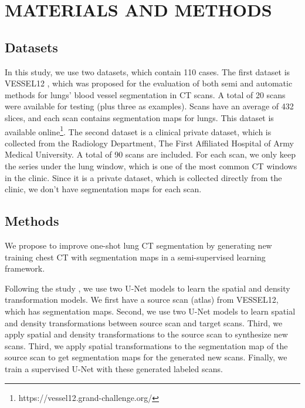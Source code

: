 \documentclass{article}
\begin{document}
\section{MATERIALS AND METHODS}
\label{sec:materials}

\subsection{Datasets}
\label{dataset}
In this study, we use two datasets, which contain 110 cases.
The first dataset is VESSEL12 \cite{rudyanto2014comparing}, which was proposed for the evaluation of both semi and automatic methods for lungs’ blood vessel segmentation in CT scans. A total of 20 scans were available for testing (plus three as examples). Scans have an average of 432 slices, and each scan contains segmentation maps for lungs. This dataset is available online\footnote{https://vessel12.grand-challenge.org/}.
The second dataset is a clinical private dataset, which is collected from the Radiology Department, The First Affiliated Hospital of Army Medical University. A total of 90 scans are included. For each scan, we only keep the series under the lung window, which is one of the most common CT windows in the clinic. Since it is a private dataset, which is collected directly from the clinic, we don't have segmentation maps for each scan. 

\subsection{Methods}
\label{methods}
We propose to improve one-shot lung CT segmentation by generating new training chest CT with segmentation maps in a semi-supervised learning framework.

Following the study \cite{zhao2019data}, we use two U-Net models to learn the spatial and density transformation models. 
We first have a source scan (atlas) from VESSEL12, which has segmentation maps. Second, we use two U-Net models to learn spatial and density transformations between source scan and target scans. Third, we apply spatial and density transformations to the source scan to synthesize new scans. Third, we apply spatial transformations to the segmentation map of the source scan to get segmentation maps for the generated new scans. Finally, we train a supervised U-Net with these generated labeled scans.
\end{document}
